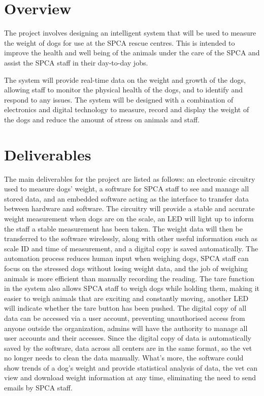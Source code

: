 
\chapter{Overview}
The project involves designing an intelligent system that will be used to measure the weight of dogs for use at the SPCA rescue centres. This is intended to improve the health and well being of the animals under the care of the SPCA and assist the SPCA staff in their day-to-day jobs.

The system will provide real-time data on the weight and growth of the dogs, allowing staff to monitor the physical health of the dogs, and to identify and respond to any issues. The system will be designed with a combination of electronics and digital technology to measure, record and display the weight of the dogs and reduce the amount of stress on animals and staff. 

\chapter{Deliverables}

The main deliverables for the project are listed as follows: an electronic circuitry used to measure dogs' weight, a software for SPCA staff to see and manage all stored data, and an embedded software acting as the interface to transfer data between hardware and software. The circuitry will provide a stable and accurate weight measurement when dogs are on the scale, an LED will light up to inform the staff a stable measurement has been taken. The weight data will then be transferred to the software wirelessly, along with other useful information such as scale ID and time of measurement, and a digital copy is saved automatically. The automation process reduces human input when weighing dogs, SPCA staff can focus on the stressed dogs without losing weight data, and the job of weighing animals is more efficient than manually recording the reading. The tare function in the system also allows SPCA staff to weigh dogs while holding them, making it easier to weigh animals that are exciting and constantly moving, another LED will indicate whether the tare button has been pushed. The digital copy of all data can be accessed via a user account, preventing unauthorised access from anyone outside the organization, admins will have the authority to manage all user accounts and their accesses. Since the digital copy of data is automatically saved by the software, data across all centers are in the same format, so the vet no longer needs to clean the data manually. What's more, the software could show trends of a dog's weight and provide statistical analysis of data, the vet can view and download weight information at any time, eliminating the need to send emails by SPCA staff.



